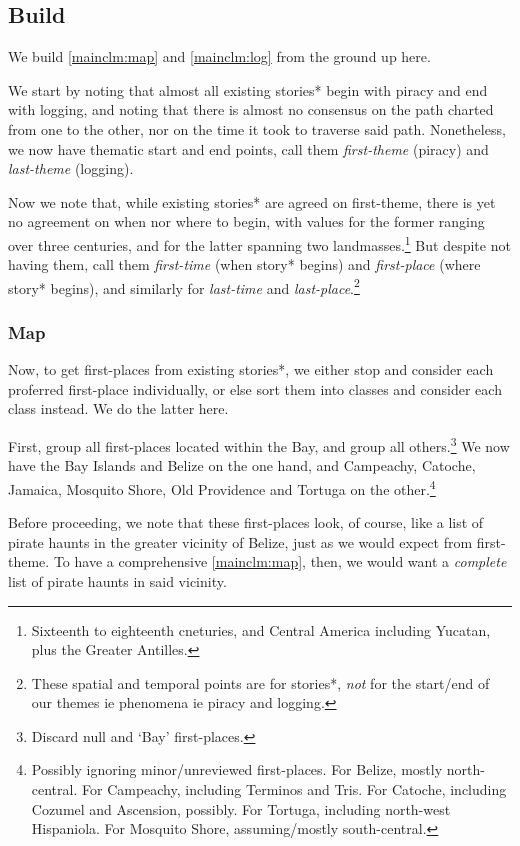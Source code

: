\documentclass{amsart}
\newcommand{\mention}[1]{\textit{#1}}%
\theoremstyle{definition}
\theoremstyle{remark}
\begin{document}
	\subsection{Build}
		\label{ss:build}
		We build \ref{mainclm:map} and \ref{mainclm:log} from the ground up here.
		
		We start by noting that almost all existing stories* begin with piracy and end with logging, and noting that there is almost no consensus on the path charted from one to the other, nor on the time it took to traverse said path. Nonetheless, we now have thematic start and end points, call them \mention{first-theme} (piracy) and \mention{last-theme} (logging).
		
		Now we note that, while existing stories* are agreed on first-theme, there is yet no agreement on when nor where to begin, with values for the former ranging over three centuries, and for the latter spanning two landmasses.\footnote{Sixteenth to eighteenth cneturies, and Central America including Yucatan, plus the Greater Antilles.} But despite not having them, call them \mention{first-time} (when story* begins) and \mention{first-place} (where story* begins), and similarly for \mention{last-time} and \mention{last-place}.\footnote{These spatial and temporal points are for stories*, \emph{not} for the start/end of our themes ie phenomena ie piracy and logging.}
		\subsubsection{Map}
			\label{sss:map}
			Now, to get first-places from existing stories*, we either stop and consider each proferred first-place individually, or else sort them into classes and consider each class instead. We do the latter here.
		
			First, group all first-places located within the Bay, and group all others.\footnote{Discard null and `Bay' first-places.} We now have the Bay Islands and Belize on the one hand, and Campeachy, Catoche, Jamaica, Mosquito Shore, Old Providence and Tortuga on the other.\footnote{Possibly ignoring minor/unreviewed first-places. For Belize, mostly north-central. For Campeachy, including Terminos and Tris. For Catoche, including Cozumel and Ascension, possibly. For Tortuga, including north-west Hispaniola. For Mosquito Shore, assuming/mostly south-central.}
		
			Before proceeding, we note that these first-places look, of course, like a list of pirate haunts in the greater vicinity of Belize, just as we would expect from first-theme. To have a comprehensive \ref{mainclm:map}, then, we would want a \emph{complete} list of pirate haunts in said vicinity.
		
\end{document}
